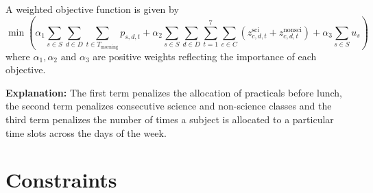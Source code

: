 \documentclass[11pt]{article}
\begin{document}
\noindent A weighted objective function is given by
\[
\min \left( 
\alpha_1 \sum_{s \in S}\sum_{d \in D}\sum_{t \in T_\text{morning}} p_{s,d,t} + \alpha_2 \sum_{s \in S}\sum_{d \in D}\sum_{t=1}^{7}\sum_{c \in C} \left(z_{c,d,t}^{\text{sci}} + z_{c,d,t}^{\text{nonsci}}\right)
+ \alpha_3 \sum_{s \in S} u_s
\right)
\]
where \(\alpha_1,\alpha_2 \text{ and } \alpha_3\) are positive weights reflecting the importance of each objective.

\textbf{Explanation:} The first term penalizes the allocation of practicals before lunch, the second term penalizes consecutive science and non-science classes and the third term penalizes the number of times a subject is allocated to a particular time slots across the days of the week.

\section*{Constraints}
\end{document}
